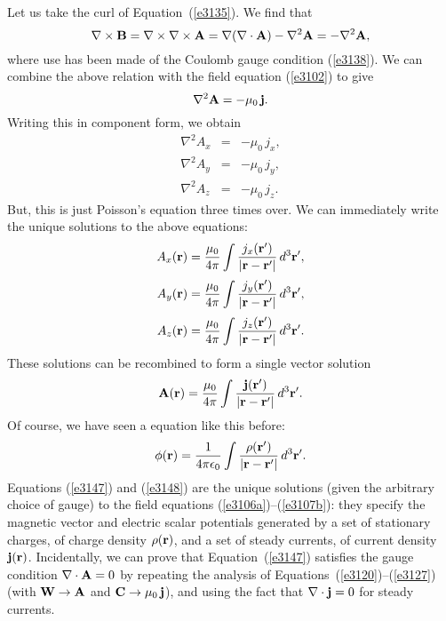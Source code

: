 Let us take the curl of Equation~(\ref{e3135}). We find that
\begin{equation}
\nabla\times{\bf B} = \nabla\times\nabla\times {\bf A} = \nabla(\nabla\cdot{\bf A})
-\nabla^2{\bf A} = - \nabla^2{\bf A},
\end{equation}
where use has been made of the Coulomb gauge condition 
(\ref{e3138}). We can combine the above
relation with the field equation (\ref{e3102}) to give
\begin{equation}
\nabla^2{\bf A} = - \mu_0 \,{\bf j}.
\end{equation}
Writing this in component form, we obtain
\begin{eqnarray}
\nabla^2 A_x &=& - \mu_0\, j_x,\\[0.5ex]
\nabla^2 A_y &=& - \mu_0\, j_y,\\[0.5ex]
\nabla^2 A_z &=& - \mu_0\, j_z.
\end{eqnarray}
But, this is just Poisson's equation three times over. We can immediately
write the unique solutions to the above equations:
\begin{eqnarray}
A_x({\bf r}) = \frac{\mu_0}{4\pi} \int \frac{j_x({\bf r}')}{|{\bf r} - {\bf r}'|}
\,d^3{\bf r}',\\[0.5ex]
A_y({\bf r}) = \frac{\mu_0}{4\pi} \int \frac{j_y({\bf r}')}{|{\bf r} - {\bf r}'|}
\,d^3{\bf r}',\\[0.5ex]
A_z({\bf r}) = \frac{\mu_0}{4\pi} \int \frac{j_z({\bf r}')}{|{\bf r} - {\bf r}'|}
\,d^3{\bf r}'.
\end{eqnarray}
These solutions can be recombined to form a single vector solution
\begin{equation}
{\bf A}({\bf r}) = \frac{\mu_0}{4\pi} 
\int \frac{{\bf j}({\bf r}')}{|{\bf r} - {\bf r}'|}
\,d^3{\bf r}'.\label{e3147}
\end{equation}
Of course, we have seen a equation like this before:
\begin{equation}\label{e3148}
\phi({\bf r}) = \frac{1}{4\pi\epsilon_0} \int
\frac{\rho({\bf r}')}{|{\bf r} - {\bf r}'|}\,d^3{\bf r}'.
\end{equation}
Equations (\ref{e3147}) and (\ref{e3148}) are the unique solutions (given the arbitrary choice
of gauge) to the field equations (\ref{e3106a})--(\ref{e3107b}): they specify the magnetic
vector and electric scalar potentials generated by a set of stationary
charges, of charge density $\rho({\bf r})$, and a set of steady currents,
of current density ${\bf j}({\bf r})$. Incidentally, we can prove that
Equation~(\ref{e3147}) satisfies the gauge condition $\nabla\cdot{\bf A}=0$ by repeating
the analysis of Equations~(\ref{e3120})--(\ref{e3127}) (with ${\bf W}\rightarrow{\bf A}$
and ${\bf C} \rightarrow \mu_0\, {\bf j}$), and using the fact that
$\nabla\cdot{\bf j} = 0$ for steady currents. 

